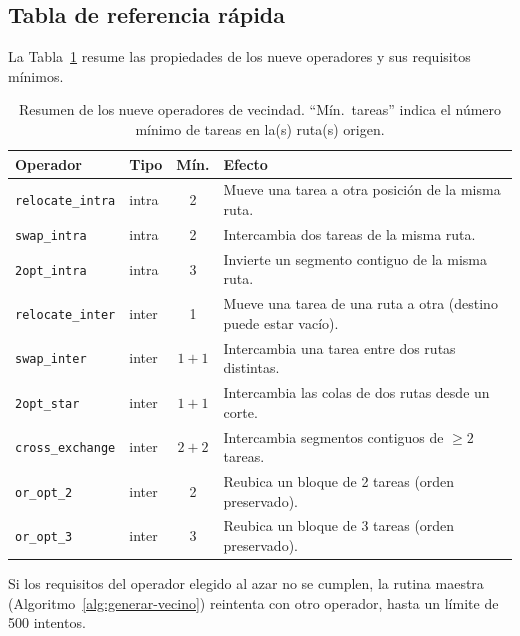 \subsection{Tabla de referencia rápida}
\label{subsec:referencia-operadores}

La Tabla~\ref{tab:resumen-operadores} resume las propiedades de los nueve
operadores y sus requisitos mínimos.

\begin{table}[h]
\centering
\caption{Resumen de los nueve operadores de vecindad. ``Mín.\ tareas''
         indica el número mínimo de tareas en la(s) ruta(s) origen.}
\label{tab:resumen-operadores}
\small
\renewcommand{\arraystretch}{1.25}
\begin{tabular}{llcp{6.4cm}}
\toprule
Operador & Tipo & Mín. & Efecto \\
\midrule
\texttt{relocate\_intra} & intra & 2 & Mueve una tarea a otra posición de la misma ruta. \\
\texttt{swap\_intra}     & intra & 2 & Intercambia dos tareas de la misma ruta. \\
\texttt{2opt\_intra}     & intra & 3 & Invierte un segmento contiguo de la misma ruta. \\
\texttt{relocate\_inter} & inter & 1 & Mueve una tarea de una ruta a otra (destino puede estar vacío). \\
\texttt{swap\_inter}     & inter & $1{+}1$ & Intercambia una tarea entre dos rutas distintas. \\
\texttt{2opt\_star}      & inter & $1{+}1$ & Intercambia las colas de dos rutas desde un corte. \\
\texttt{cross\_exchange} & inter & $2{+}2$ & Intercambia segmentos contiguos de $\geq 2$ tareas. \\
\texttt{or\_opt\_2}      & inter & 2 & Reubica un bloque de 2 tareas (orden preservado). \\
\texttt{or\_opt\_3}      & inter & 3 & Reubica un bloque de 3 tareas (orden preservado). \\
\bottomrule
\end{tabular}
\end{table}

Si los requisitos del operador elegido al azar no se cumplen, la rutina
maestra (Algoritmo~\ref{alg:generar-vecino}) reintenta con otro operador,
hasta un límite de 500 intentos.

